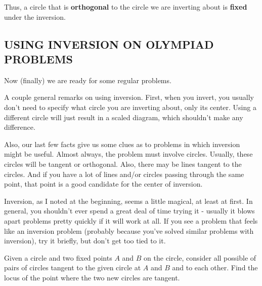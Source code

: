 Thus, a circle that is \textbf{orthogonal} to the circle we are inverting about is \textbf{fixed} under the inversion.


\subsection{USING INVERSION ON OLYMPIAD PROBLEMS}


Now (finally) we are ready for some regular problems.

A couple general remarks on using inversion.  First, when you invert, you usually don't need to specify what circle you are inverting about, only its center.  Using a different circle will just result in a scaled diagram, which shouldn't make any difference.

Also, our last few facts give us some clues as to problems in which inversion might be useful.  Almost always, the problem must involve circles.  Usually, these circles will be tangent or orthogonal.  Also, there may be lines tangent to the circles.  And if you have a lot of lines and/or circles passing through the same point, that point is a good candidate for the center of inversion.

Inversion, as I noted at the beginning, seems a little magical, at least at first.  In general, you shouldn't ever spend a great deal of time trying it - usually it blows apart problems pretty quickly if it will work at all.  If you see a problem that feels like an inversion problem (probably because you've solved similar problems with inversion), try it briefly, but don't get too tied to it.

\begin{example}
Given a circle and two fixed points $A$ and $B$ on the circle, consider all possible of pairs of circles tangent to the given circle at $A$ and $B$ and to each other.  Find the locus of the point where the two new circles are tangent.    
\end{example}

